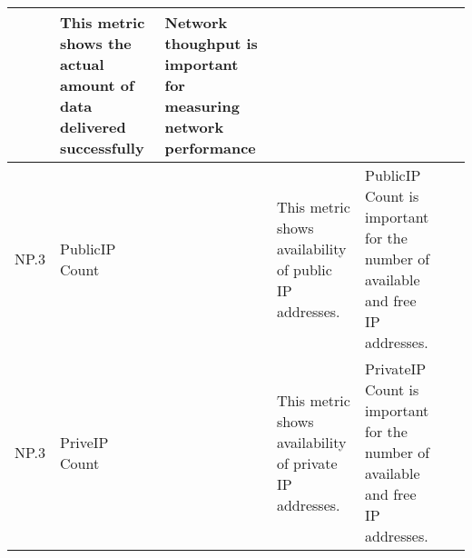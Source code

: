 \begin{table*}[p]
\begin{scriptsize}
\begin{center}
\begin{tabular}{lp{}p{}p{}p{}p{}}
~&
This metric shows the actual amount of data delivered successfully &
Network thoughput is important for measuring network performance &
~ \\
\hline
NP.3 &
PublicIP Count &
~&
This metric shows availability of public IP addresses. &
PublicIP Count is important for the number of available and free IP addresses. &
~ \\
\hline
NP.3 &
PriveIP Count &
~& 
This metric shows availability of private IP addresses. &
PrivateIP Count is important for the number of available and free IP addresses. &
~ \\
\hline
\end{tabular}
\end{center}
\end{scriptsize}
\end{table*}

